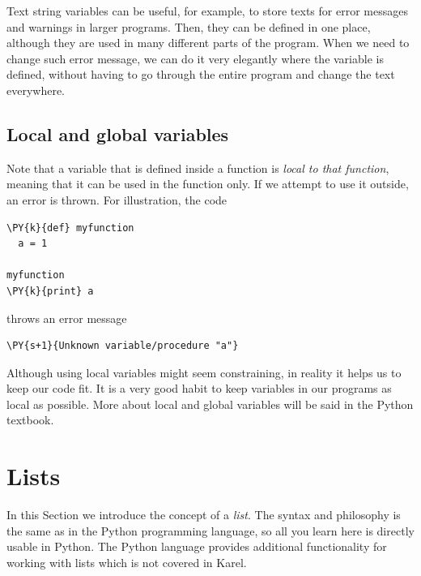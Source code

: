 \noindent
Text string variables can be useful, for example, to store texts for 
error messages and warnings in larger programs. Then, they can be 
defined in one place, although they are used in many different parts of 
the program. When we need to change such error message, we can do it 
very elegantly where the variable is defined, without having to go through 
the entire program and change the text everywhere.  

\subsection[\ \ Local and global variables]{Local and global variables}\label{subsec:karellocvar}

Note that a variable that is defined inside a function is {\em local to that function}, 
meaning that it can be used in the function only. If we attempt to use it 
outside, an error is thrown. For illustration, the code \\

\begin{bbox}
\begin{Verbatim}[commandchars=\\\{\}]
\PY{k}{def} myfunction
  a = 1

myfunction
\PY{k}{print} a  
\end{Verbatim}
\end{bbox}
\vspace{6mm}

\noindent
throws an error message \\

\begin{ybox}
\begin{Verbatim}[commandchars=\\\{\}]
\PY{s+1}{Unknown variable/procedure "a"} 
\end{Verbatim}
\end{ybox}
\vspace{6mm}

\noindent
Although using local variables might seem constraining, in reality it helps us 
to keep our code fit. It is a very good habit to keep variables in our programs 
as local as possible. More about local and global variables will be said in 
the Python textbook.

\section{Lists}

In this Section we introduce the concept of a {\em list}. 
The syntax and philosophy is the same as in the Python programming 
language, so all you learn here is directly usable in Python.
The Python language provides additional functionality for
working with lists which is not covered in Karel.

